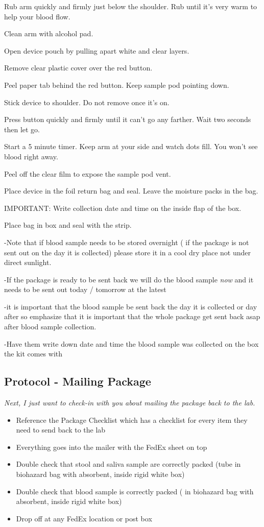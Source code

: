 \documentclass[]{book}
\begin{document}
Rub arm quickly and firmly just below the shoulder. Rub until it's very warm to help your blood flow.

Clean arm with alcohol pad.

Open device pouch by pulling apart white and clear layers.

Remove clear plastic cover over the red button.

Peel paper tab behind the red button. Keep sample pod pointing down.

Stick device to shoulder. Do not remove once it's on.

Press button quickly and firmly until it can't go any farther. Wait two seconds then let go.

Start a 5 minute timer. Keep arm at your side and watch dots fill. You won't see blood right away.

Peel off the clear film to expose the sample pod vent.

Place device in the foil return bag and seal. Leave the moisture packs in the bag.

IMPORTANT: Write collection date and time on the inside flap of the box.

Place bag in box and seal with the strip.

-Note that if blood sample needs to be stored overnight ( if the package is not sent out on the day it is collected) please store it in a cool dry place not under direct sunlight.

-If the package is ready to be sent back we will do the blood sample \emph{now} and it needs to be sent out today / tomorrow at the latest

-it is important that the blood sample be sent back the day it is collected or day after so emphasize that it is important that the whole package get sent back asap after blood sample collection.

-Have them write down date and time the blood sample was collected on the box the kit comes with

\hypertarget{protocol---mailing-package-2}{%
\subsection{Protocol - Mailing Package}\label{protocol---mailing-package-2}}

\emph{Next, I just want to check-in with you about mailing the package back to the lab.}

\begin{itemize}
\item
  Reference the Package Checklist which has a checklist for every item they need to send back to the lab
\item
  Everything goes into the mailer with the FedEx sheet on top
\item
  Double check that stool and saliva sample are correctly packed (tube in biohazard bag with absorbent, inside rigid white box)
\item
  Double check that blood sample is correctly packed ( in biohazard bag with absorbent, inside rigid white box)
\item
  Drop off at any FedEx location or post box
\end{itemize}
\end{document}

